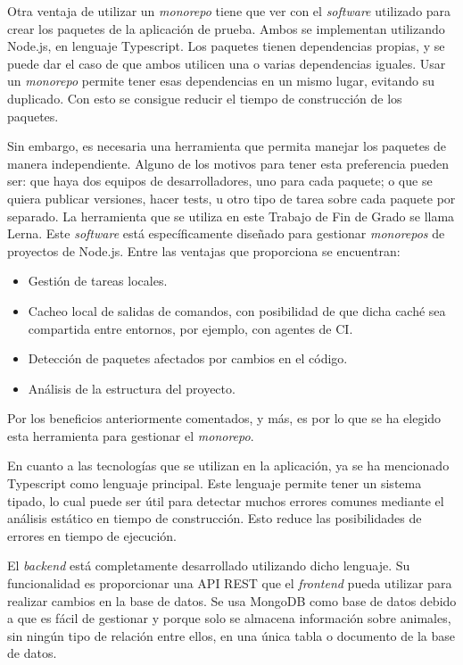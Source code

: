 Otra ventaja de utilizar un \textit{monorepo} tiene que ver con el \textit{software} utilizado para crear los paquetes de la aplicación de prueba. Ambos se implementan utilizando Node.js, en lenguaje Typescript\cite{ts}. Los paquetes tienen dependencias propias, y se puede dar el caso de que ambos utilicen una o varias dependencias iguales. Usar un \textit{monorepo} permite tener esas dependencias en un mismo lugar, evitando su duplicado. Con esto se consigue reducir el tiempo de construcción de los paquetes.

Sin embargo, es necesaria una herramienta que permita manejar los paquetes de manera independiente. Alguno de los motivos para tener esta preferencia pueden ser: que haya dos equipos de desarrolladores, uno para cada paquete; o que se quiera publicar versiones, hacer tests, u otro tipo de tarea sobre cada paquete por separado. La herramienta que se utiliza en este Trabajo de Fin de Grado se llama Lerna\cite{lerna}. Este \textit{software} está específicamente diseñado para gestionar \textit{monorepos} de proyectos de Node.js. Entre las ventajas que proporciona se encuentran:

\begin{itemize}
  \item Gestión de tareas locales.
  \item Cacheo local de salidas de comandos, con posibilidad de que dicha caché sea compartida entre entornos, por ejemplo, con agentes de CI.
  \item Detección de paquetes afectados por cambios en el código.
  \item Análisis de la estructura del proyecto.
\end{itemize}

Por los beneficios anteriormente comentados, y más, es por lo que se ha elegido esta herramienta para gestionar el \textit{monorepo}.

En cuanto a las tecnologías que se utilizan en la aplicación, ya se ha mencionado Typescript como lenguaje principal. Este lenguaje permite tener un sistema tipado, lo cual puede ser útil para detectar muchos errores comunes mediante el análisis estático en tiempo de construcción. Esto reduce las posibilidades de errores en tiempo de ejecución.

El \textit{backend} está completamente desarrollado utilizando dicho lenguaje. Su funcionalidad es proporcionar una API REST que el \textit{frontend} pueda utilizar para realizar cambios en la base de datos. Se usa MongoDB\cite{mongodb} como base de datos debido a que es fácil de gestionar y porque solo se almacena información sobre animales, sin ningún tipo de relación entre ellos, en una única tabla o documento de la base de datos.

